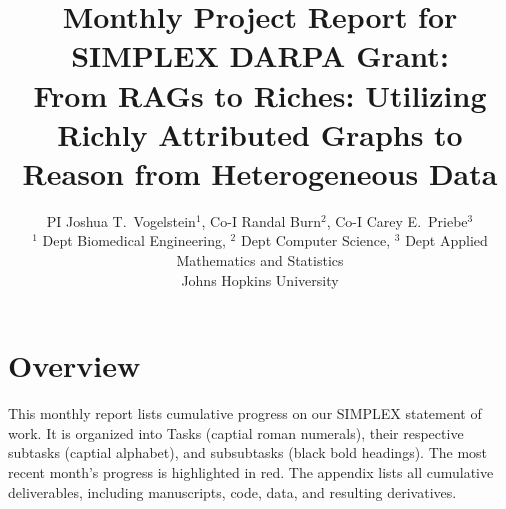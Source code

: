\documentclass[11pt]{article}
\newcommand{\db}[1]{{\color{dark_blue}{#1}}}
\newcommand{\bb}[1]{{\textbf{\db{#1}}}}
\begin{document}

\title{Monthly Project Report for SIMPLEX DARPA Grant: \\
From RAGs to Riches: Utilizing Richly Attributed Graphs to Reason from Heterogeneous Data}

\author{PI Joshua T.~Vogelstein$^1$, Co-I Randal Burn$^2$, Co-I Carey E.~Priebe$^3$ \\
$^1$ Dept Biomedical Engineering, $^2$ Dept Computer Science, $^3$ Dept Applied Mathematics and Statistics \\
Johns Hopkins University}


\maketitle


\section*{Overview}

This monthly report lists cumulative progress on our SIMPLEX statement of work.  It is organized into Tasks (captial roman numerals), their respective subtasks (captial alphabet), and subsubtasks (black bold headings).
The most recent month's progress is highlighted in red. The appendix lists all cumulative deliverables, including manuscripts, code,  data,  and resulting derivatives.
\end{document}
